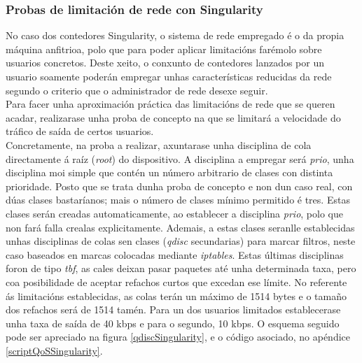 \subsubsection{Probas de limitación de rede con Singularity}

No caso dos contedores Singularity, o sistema de rede empregado é o da propia máquina anfitrioa, polo que para poder aplicar limitacións farémolo sobre usuarios concretos. Deste xeito, o conxunto de contedores lanzados por un usuario soamente poderán empregar unhas características reducidas da rede segundo o criterio que o administrador de rede desexe seguir.\\

Para facer unha aproximación práctica das limitacións de rede que se queren acadar, realizarase unha proba de concepto na que se limitará a velocidade do tráfico de saída de certos usuarios.\\

Concretamente, na proba a realizar, axuntarase unha disciplina de cola directamente á raíz ({\it root}) do dispositivo. A disciplina a empregar será {\it prio}, unha disciplina moi simple que contén un número arbitrario de clases con distinta prioridade. Posto que se trata dunha proba de concepto e non dun caso real, con dúas clases bastaríanos; mais o número de clases mínimo permitido é tres. Estas clases serán creadas automaticamente, ao establecer a disciplina {\it prio}, polo que non fará falla crealas explicitamente. Ademais, a estas clases seranlle establecidas unhas disciplinas de colas sen clases (\textit{qdisc} secundarias) para marcar filtros, neste caso baseados en marcas colocadas mediante \textit{iptables}. Estas últimas disciplinas foron de tipo {\it tbf}, as cales deixan pasar paquetes até unha determinada taxa, pero coa posibilidade de aceptar refachos curtos que excedan ese límite. No referente ás limitacións establecidas, as colas terán un máximo de 1514 bytes e o tamaño dos refachos será de 1514 tamén. Para un dos usuarios limitados establecerase  unha taxa de saída de 40 kbps e para o segundo, 10 kbps. O esquema seguido pode ser apreciado na figura \ref{qdiscSingularity}, e o código asociado, no apéndice \ref{scriptQoSSingularity}. \\


